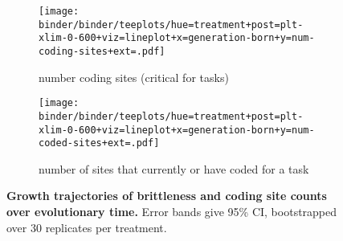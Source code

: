 \begin{figure}
    \centering
    \begin{subfigure}{\linewidth}
    \texttt{[image: binder/binder/teeplots/hue=treatment+post=plt-xlim-0-600+viz=lineplot+x=generation-born+y=num-coding-sites+ext=.pdf]}
    \caption{\footnotesize number coding sites (critical for tasks)}
    \label{fig:num-coding-sites:coding}
    \end{subfigure}

    \begin{subfigure}{\linewidth}
\texttt{[image: binder/binder/teeplots/hue=treatment+post=plt-xlim-0-600+viz=lineplot+x=generation-born+y=num-coded-sites+ext=.pdf]}
    \caption{\footnotesize number of sites that currently or have coded for a task}
    \label{fig:num-coding-sites:coded}
    \end{subfigure}
    \caption{
        \textbf{Growth trajectories of brittleness and coding site counts over evolutionary time.}
        \footnotesize
        Error bands give 95\% CI, bootstrapped over 30 replicates per treatment.
    }
    \label{fig:num-coding-sites}
\end{figure}
